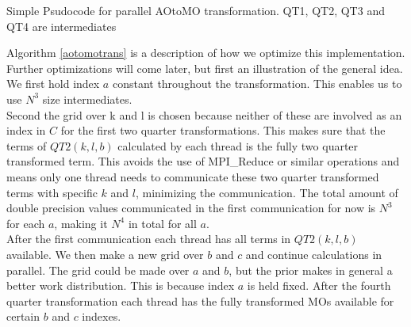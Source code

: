 \begin{algorithm}[H]
  
 \caption{Simple Psudocode for parallel AOtoMO transformation. QT1, QT2, QT3 and QT4 are intermediates}
 \label{aotomotrans}
\end{algorithm}

Algorithm \ref{aotomotrans} is a description of how we optimize this implementation. Further optimizations will come later, but first an illustration of the general idea. We first hold index $a$ constant throughout the transformation. This enables us to use $N^3$ size intermediates. \\

Second the grid over k and l is chosen because neither of these are involved as an index in $C$ for the first two quarter transformations. This makes sure that the terms of $QT2(k,l,b)$ calculated by each thread is the fully two quarter transformed term. This avoids the use of MPI\_Reduce or similar operations and means only one thread needs to communicate these two quarter transformed terms with specific $k$ and $l$, minimizing the communication. The total amount of double precision values communicated in the first communication for now is $N^3$ for each $a$, making it $N^4$ in total for all $a$. \\

After the first communication each thread has all terms in $QT2(k,l,b)$ available. We then make a new grid over $b$ and $c$ and continue calculations in parallel. The grid could be made over $a$ and $b$, but the prior makes in general a better work distribution. This is because index $a$ is held fixed. After the fourth quarter transformation each thread has the fully transformed MOs available for certain $b$ and $c$ indexes. \\

